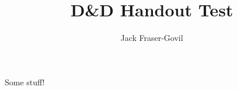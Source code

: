 \documentclass[theme=dnd]{rpghandout}
\title{D\&D Handout Test}
\author{Jack Fraser-Govil}
\begin{document}
    \maketitle

    Some stuff!
\end{document}
